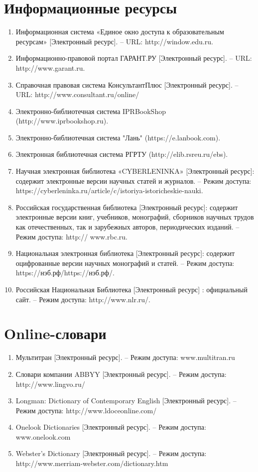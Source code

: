 \section{Информационные ресурсы}
\begin{enumerate}
\item Информационная система «Единое окно доступа к образовательным ресурсам» [Электронный ресурс]. – URL: http://window.edu.ru.
\item Информационно-правовой портал ГАРАНТ.РУ [Электронный ресурс]. – URL: http://www.garant.ru. 
\item Справочная правовая система КонсультантПлюс [Электронный ресурс]. – URL: http://www.consultant.ru/online/
\item Электронно-библиотечная система IPRBookShop (http://www.iprbookshop.ru).
\item Электронно-библиотечная система "Лань" (https://e.lanbook.com).
\item Электронная библиотечная система РГРТУ (http://elib.rsreu.ru/ebs).
\item Научная электронная библиотека «CYBERLENINKA» [Электронный ресурс]: содержит электронные версии научных статей и журналов. – Режим доступа: https://cyberleninka.ru/article/c/istoriya-istoricheskie-nauki. 
\item Российская государственная библиотека [Электронный ресурс]: содержит электронные версии книг, учебников, монографий, сборников научных трудов как отечественных, так и зарубежных авторов, периодических изданий. – Режим доступа: http:// www.rbc.ru.
\item Национальная электронная библиотека [Электронный ресурс]: содержит оцифрованные версии научных монографий и статей. – Режим доступа: https://нэб.рф/https://нэб.рф/.
\item Российская Национальная Библиотека [Электронный ресурс] : официальный сайт. – Режим доступа: http://www.nlr.ru/. 
\end{enumerate}
\section{Online-словари}
\begin{enumerate}
\item Мультитран [Электронный ресурс]. – Режим доступа: www.multitran.ru
\item Словари компании ABBYY [Электронный ресурс]. – Режим доступа: http://www.lingvo.ru/
\item Longman: Dictionary of Contemporary English [Электронный ресурс]. – Режим доступа: http://www.ldoceonline.com/
\item Onelook Dictionaries [Электронный ресурс]. – Режим доступа: www.onelook.com
\item Webster’s Dictionary [Электронный ресурс]. – Режим доступа: http://www.merriam-webster.com/dictionary.htm 
\end{enumerate}
